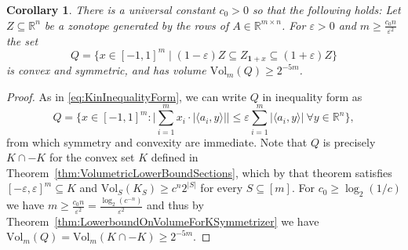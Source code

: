 \documentclass[12pt,english]{article}
\theoremstyle{theorem}
\newtheorem{corollary}[theorem]{Corollary}
\theoremstyle{remark}
\providecommand{\setR}{\mathbb{R}}
\newcommand{\Vol}{\mathrm{Vol}}
\newcommand{\eps}{\varepsilon}
\begin{document}
\begin{corollary} \label{cor:VolumeSymmetricL1}
  There is a universal constant $c_0>0$ so that the following holds:
  Let $Z \subseteq \setR^n$ be a zonotope generated by the rows of $A \in \setR^{m \times n}$. For $\eps > 0$ and $m \ge \frac{c_0n}{\eps^2}$ the set
  \[
   Q = \{ x \in [-1,1]^m \mid (1-\varepsilon) Z \subseteq Z_{\bm{1}+x} \subseteq (1+\varepsilon) Z \}
  \]
  is convex and symmetric, and has volume $\Vol_m (Q) \ge 2^{-5m}$.
\end{corollary}
\begin{proof}
As in \eqref{eq:KinInequalityForm}, we can write $Q$ in inequality form as  
\[
  Q = \Big\{x \in [-1,1]^m : \Big|\sum_{i=1}^m x_i \cdot |\langle a_i, y \rangle|\Big| \le \eps \sum_{i =1}^m |\langle a_i, y \rangle| \ \forall y \in \setR^n\Big\},\]
from which symmetry and convexity are immediate.
Note that $Q$ is precisely $K \cap -K$ for the convex set $K$ defined in Theorem~\ref{thm:VolumetricLowerBoundSections}, which by that theorem satisfies $[-\eps,\eps]^m \subseteq K$ and $\Vol_S (K_S) \ge c^n 2^{|S|}$ for every $S \subseteq [m]$. For $c_0 \geq \log_2(1/c)$ we have  $m \ge \frac{c_0n}{\varepsilon^2} = \frac{\log_2(c^{-n})}{\eps^2}$ and thus by Theorem~\ref{thm:LowerboundOnVolumeForKSymmetrizer} we have $\Vol_m(Q) = \Vol_m(K \cap -K) \geq 2^{-5m}$.
\end{proof}
\end{document}
